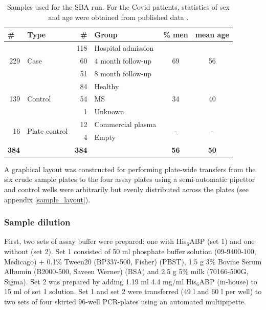 \documentclass{article}
\begin{document}
\begin{table}[H]
\centering
\caption{Samples used for the SBA run. For the Covid patients, statistics of sex and age were obtained from published data \cite{fas2}.}
\label{sba_samples}
{\renewcommand{\arraystretch}{1.3}
\begin{tabular}{|rlrl|cc|}
\hline
\multicolumn{1}{|l}{\textbf{\#}} & \textbf{Type} & \textbf{\#} & \textbf{Group} & \textbf{\% men} & \textbf{mean age} \\ \hline\hline
\multirow{3}{*}{229} & \multicolumn{1}{l|}{\multirow{3}{*}{Case}} & 118 & Hospital admission & \multicolumn{1}{c}{\multirow{3}{*}{69}} & \multirow{3}{*}{56} \\ \cline{3-4}
 & \multicolumn{1}{l|}{} & 60 & 4 month follow-up & \multicolumn{1}{c}{} &  \\ \cline{3-4}
 & \multicolumn{1}{l|}{} & 51 & 8 month follow-up & \multicolumn{1}{c}{} &  \\ \hline\hline
\multirow{3}{*}{139} & \multicolumn{1}{l|}{\multirow{3}{*}{Control}} & 84 & Healthy & \multicolumn{1}{c}{\multirow{3}{*}{34}} & \multirow{3}{*}{40} \\ \cline{3-4}
 & \multicolumn{1}{l|}{} & 54 & MS & \multicolumn{1}{c}{} &  \\ \cline{3-4}
 & \multicolumn{1}{l|}{} & 1 & Unknown & \multicolumn{1}{c}{} &  \\ \hline\hline
\multirow{2}{*}{16} & \multicolumn{1}{l|}{\multirow{2}{*}{Plate control}} & 12 & Commercial plasma & \multicolumn{1}{c}{\multirow{2}{*}{-}} & \multirow{2}{*}{-} \\ \cline{3-4}
 & \multicolumn{1}{l|}{} & 4 & Empty & \multicolumn{1}{c}{} &  \\ \hline\hline
\multicolumn{1}{|l}{\textbf{384}} &  & \textbf{384} &  & \multicolumn{1}{c}{\textbf{56}} & \textbf{50} \\ \hline
\end{tabular}
}
\end{table}

A graphical layout was constructed for performing plate-wide transfers from the six crude sample plates to the four assay plates using a semi-automatic pipettor and control wells were arbitrarily but evenly distributed across the plates (see appendix \ref{sample_layout}). 

\subsubsection{Sample dilution}
First, two sets of assay buffer were prepared: one with His$_6$ABP (set 1) and one without (set 2). Set 1 consisted of 50 ml phosphate buffer solution (09-9400-100, Medicago) + 0.1\% Tween20 (BP337-500, Fisher) (PBST), 1.5 g 3\% Bovine Serum Albumin (B2000-500, Saveen Werner) (BSA) and 2.5 g 5\% milk (70166-500G, Sigma). Set 2 was prepared by adding 1.19 ml 4.4 mg/ml His$_6$ABP (in-house) to 15 ml of set 1 solution. Set 1 and set 2 were transferred (49 \textmu l and 60 \textmu l per well) to two sets of four skirted 96-well PCR-plates using an automated multipipette.
\end{document}
